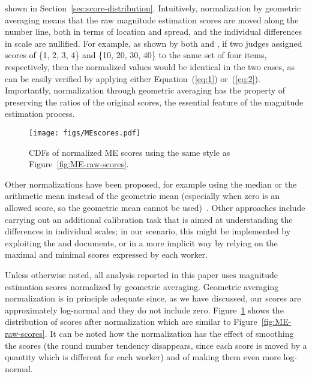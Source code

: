 shown in Section~\ref{sec:score-distribution}. Intuitively,
normalization by geometric averaging means that the raw magnitude
estimation scores are moved along the number line, both in terms of
location and spread, and the individual differences in scale are
nullified.
For example, as shown by both 
\citet{moskowitz:1977} and  
\citet{McG03}, 
if two judges assigned scores of \{1, 2, 3, 4\} and \{10, 20, 30, 40\}
to the same set of four items, respectively, then the normalized values
would be identical in the two cases, as can be easily verified by
applying either Equation~(\ref{eq:1}) or~(\ref{eq:2}).
Importantly, normalization through geometric averaging has the property
of preserving the ratios of the original scores, the essential feature
of the magnitude estimation process.
%
\begin{figure}[tp]
  \centering
  \texttt{[image: figs/MEscores.pdf]}
  \caption{CDFs of normalized ME scores using the
    same style as Figure~\ref{fig:ME-raw-scores}.
  \label{fig:ME-norm-scores}}
\end{figure}

Other normalizations have been proposed, 
for example using the median or the arithmetic mean instead of the
geometric mean (especially when zero is an allowed score, so the
geometric mean cannot be used)~\citet{moskowitz:1977}.
Other approaches include carrying out an additional calibration task
that is aimed at understanding the differences in individual scales;
in our scenario, this might be implemented by exploiting the \nkn and
\hkh documents, or in a more implicit way by relying on the maximal
and minimal scores expressed by each worker.

Unless otherwise noted, all analysis reported in this paper uses
magnitude estimation scores normalized by geometric averaging.
Geometric averaging normalization is in principle adequate since, as
we have discussed, our scores are approximately log-normal and they do
not include zero. 
Figure~\ref{fig:ME-norm-scores} shows the distribution of scores after
normalization which are similar to 
Figure~\ref{fig:ME-raw-scores}.
It can be noted how the normalization has the effect of smoothing the
scores (the round number tendency disappears, since each score is moved by a
quantity which is different for each worker) and of making them even
more log-normal.


